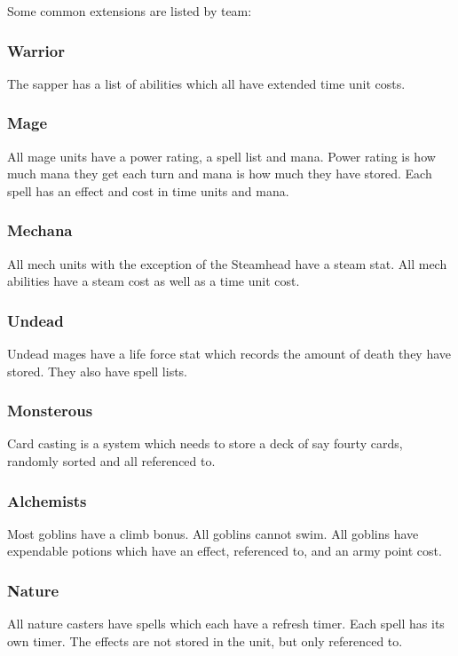 \documentclass[a4paper,twocolumn]{article}
\begin{document}
Some common extensions are listed by team:

\subsubsection{Warrior}
The sapper has a list of abilities which all have extended time unit costs.

\subsubsection{Mage}
All mage units have a power rating, a spell list and mana. Power rating is how much mana they get each turn and mana is how much they have stored. Each spell has an effect and cost in time units and mana.

\subsubsection{Mechana}
All mech units with the exception of the Steamhead have a steam stat.
All mech abilities have a steam cost as well as a time unit cost.

\subsubsection{Undead}
Undead mages have a life force stat which records the amount of death they have stored. They also have spell lists.

\subsubsection{Monsterous}
Card casting is a system which needs to store a deck of say fourty cards, randomly sorted and all referenced to. 

\subsubsection{Alchemists}
Most goblins have a climb bonus.
All goblins cannot swim.
All goblins have expendable potions which have an effect, referenced to, and an army point cost.

\subsubsection{Nature}
All nature casters have spells which each have a refresh timer. Each spell has its own timer. The effects are not stored in the unit, but only referenced to.
\end{document}
